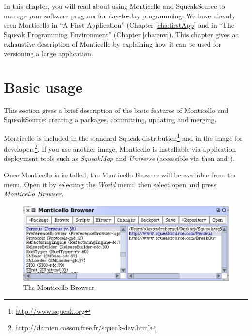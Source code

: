 \documentclass[a4paper,10pt,twoside]{book}
\begin{document}
In this chapter, you will read about using Monticello and SqueakSource to manage your software program for day-to-day programming. We have already seen Monticello in ``A First Application'' (Chapter \ref{cha:firstApp} and in ``The Squeak Programming Environment'' (Chapter \ref{cha:env}). This chapter gives an exhaustive description of Monticello by explaining how it can be used for versioning a large application.


\section{Basic usage}

This section gives a brief description of the basic features of Monticello and SqueakSource: creating a packages, committing, updating and merging.

Monticello is included in the standard Squeak distribution\footnote{\url{http://www.squeak.org}} and in the image for developers\footnote{\url{http://damien.cassou.free.fr/squeak-dev.html}}. If you use another image, Monticello is installable via application deployment tools such as \emph{SqueakMap} and \emph{Universe} (accessible via  then  and ).

Once Monticello is installed, the Monticello Browser will be available from the  menu. Open it by selecting the \emph{World} menu, then select open and press \emph{Monticello Browser}.

\begin{figure}[ht]\centering
	\includegraphics[width=.75\linewidth]{monticello.png}
	\caption{The Monticello Browser.}
\end{figure}
\end{document}
